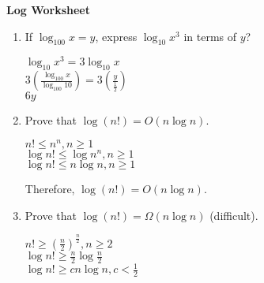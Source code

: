 \documentclass[12pt]{article}
\begin{document}
\newcommand{\I}{\mbox{{\em Int}}}
\newcommand{\lt}{\mbox{{\em left}}}
\newcommand{\rt}{\mbox{{\em right}}}
\newcommand{\ld}{\Delta^l}
\newcommand{\rd}{\Delta^r}
\newcommand{\lsp}[1]{\large\renewcommand{\baselinestretch}{#1}\normalsize}
\newcommand{\hsp}{\hspace{.2in}}

\def\Endwhile{\mbox{\bf endwhile\ }}
\def\Or{\mbox{\bf or\ }}
\def\Do{\mbox{\bf do\ }}
\def\Downto{\mbox{\bf downto\ }}
\def\Int{\mbox{\bf int\ }}
\def\To{\mbox{\bf to\ }}
\def\Repeat{\mbox{\bf repeat\ }}
\def\Until{\mbox{\bf until\ }}
\def\Return{\mbox{\bf return\ }}
\def\Not{\mbox{\bf not\ }}
\def\And{\mbox{\bf and\ }}
\def\For{\mbox{\bf for\ }}
\def\Foreach{\mbox{\bf foreach\ }}
\def\Else{\mbox{\bf else\ }}
\def\Elseif{\mbox{\bf elseif\ }}
\def\End{\mbox{\bf end\ }}
\def\If{\mbox{\bf if\ }}
\def\Mod{\mbox{\bf \ mod\ }}
\def\Then{\mbox{\bf then\ }}
\def\While{\mbox{\bf while\ }}
\def\Output{\mbox{\bf output\ }}


\lsp{1}
\pagestyle{plain}
\begin{center}
{\bf
Log Worksheet
}
\end{center}

\begin{enumerate}

\item If $\log_{100} x = y$, express $\log_{10} x^3$ in terms of $y$?

$\log_{10} x^3 = 3 \log_{10}x$\\
$3(\frac{\log_{100} x}{\log_{100} 10}) = 3(\frac{y}{\frac{1}{2}})$\\
$6y$

\vspace*{0.25in}

\item Prove that $\log (n!) = O(n \log n)$.

$n! \leq n^n, n \geq 1$\\
$\log{n!} \leq \log{n^n}, n \geq 1$\\
$\log{n!} \leq n \log{n}, n \geq 1$

Therefore, $\log (n!) = O(n \log n)$.
\vspace*{0.25in}

\item Prove that $\log (n!) = \Omega(n \log n)$ (difficult).

$n! \geq (\frac{n}{2})^{\frac{n}{2}}, n \geq 2$\\
$\log{n!} \geq \frac{n}{2} \log \frac{n}{2}$\\
$\log{n!} \geq c n \log n, c < \frac{1}{2}$
\end{enumerate}
\end{document}
